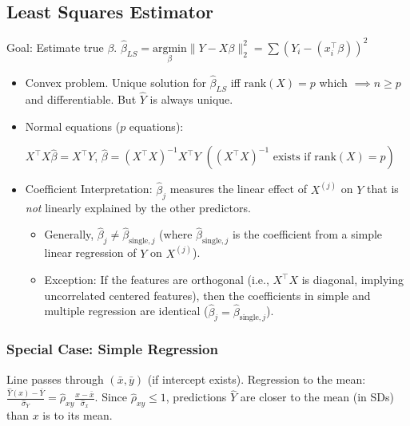 \subsection*{Least Squares Estimator}
Goal: Estimate true $\beta$.
$\hat{\beta}_{LS} = \underset{\beta}{\text{argmin}} \|Y - X\beta\|_2^2 = \sum (Y_i - (x_i^\top \beta))^2$
\begin{itemize}
    \item Convex problem. Unique solution for $\hat{\beta}_{LS}$ iff $\text{rank}(X)=p$ which $\implies n \ge p$ and differentiable. But $\hat{Y}$ is always unique.
    \item Normal equations ($p$ equations): 

        $X^\top X \hat{\beta} = X^\top Y$, 
        $\hat{\beta} = (X^\top X)^{-1} X^\top Y$
        {\tiny $((X^\top X)^{-1} \text{ exists if rank}(X)=p)$}
    \item Coefficient Interpretation: $\hat{\beta}_j$ measures the linear effect of $X^{(j)}$ on $Y$ that is \textit{not} linearly explained by the other predictors.
        \begin{itemize}
            \item Generally, $\hat{\beta}_j \neq \hat{\beta}_{\text{single},j}$ (where $\hat{\beta}_{\text{single},j}$ is the coefficient from a simple linear regression of $Y$ on $X^{(j)}$).
            \item Exception: If the features are orthogonal (i.e., $X^\top X$ is diagonal, implying uncorrelated centered features), then the coefficients in simple and multiple regression are identical ($\hat{\beta}_j = \hat{\beta}_{\text{single},j}$).
        \end{itemize}
\end{itemize}

\subsubsection*{Special Case: Simple Regression}
Line passes through $(\bar{x}, \bar{y})$ (if intercept exists).
Regression to the mean:
$\frac{\hat{Y}(x) - \bar{Y}}{\hat{\sigma}_Y} = \hat{\rho}_{xy} \frac{x - \bar{x}}{\hat{\sigma}_x}$.
Since $\hat{\rho}_{xy} \leq 1$, predictions $\hat{Y}$ are closer to the mean (in SDs) than $x$ is to its mean.


